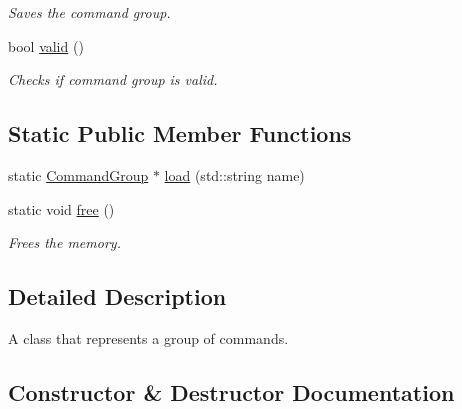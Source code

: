 \begin{DoxyCompactItemize}
\begin{DoxyCompactList}\small\item\em Saves the command group. \end{DoxyCompactList}\item 
bool \hyperlink{class_r_c_f_1_1_server_1_1_command_group_ad509cf90975512aed3af87774e4be8ed}{valid} ()
\begin{DoxyCompactList}\small\item\em Checks if command group is valid. \end{DoxyCompactList}\end{DoxyCompactItemize}
\subsection*{Static Public Member Functions}
\begin{DoxyCompactItemize}
\item 
static \hyperlink{class_r_c_f_1_1_server_1_1_command_group}{Command\+Group} $\ast$ \hyperlink{class_r_c_f_1_1_server_1_1_command_group_a22ff2935e5499ea5a279bd835d546ea3}{load} (std\+::string name)
\item 
\hypertarget{class_r_c_f_1_1_server_1_1_command_group_a409903e9c4776b9a4729fc76f1512ce0}{}static void \hyperlink{class_r_c_f_1_1_server_1_1_command_group_a409903e9c4776b9a4729fc76f1512ce0}{free} ()\label{class_r_c_f_1_1_server_1_1_command_group_a409903e9c4776b9a4729fc76f1512ce0}

\begin{DoxyCompactList}\small\item\em Frees the memory. \end{DoxyCompactList}\end{DoxyCompactItemize}


\subsection{Detailed Description}
A class that represents a group of commands. 

\subsection{Constructor \& Destructor Documentation}
\hypertarget{class_r_c_f_1_1_server_1_1_command_group_acf672a4d97c06a89f4c83f0aeefb0b3b}{}
